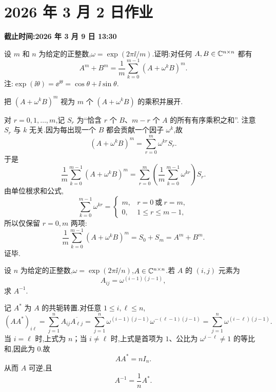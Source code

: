 \section*{2026 年 3 月 2 日作业}
{}
\noindent\textbf{截止时间:2026 年 3 月 9 日 13:30}
\setcounter{problem}{0}

\begin{problem}
设 $m$ 和 $n$ 为给定的正整数,$\omega = \exp(2\pi \ii / m)$.证明:对任何 $A, B \in \mathbb{C}^{n\times n}$ 都有
\[
A^m + B^m = \frac{1}{m}\sum_{k=0}^{m-1} \left(A + \omega^k B\right)^m.
\]
注:$\exp(\ii\theta) = \ee^{\ii\theta} = \cos\theta + \ii\sin\theta$.

\begin{solution}
把 $(A+\omega^kB)^m$ 视为 $m$ 个 $(A+\omega^kB)$ 的乘积并展开.

对 $r=0,1,\dots,m$,记 $S_r$ 为“恰含 $r$ 个 $B$、$m-r$ 个 $A$ 的所有有序乘积之和”.
注意 $S_r$ 与 $k$ 无关.因为每出现一个 $B$ 都会贡献一个因子 $\omega^k$,故
\[
(A+\omega^kB)^m=\sum_{r=0}^m \omega^{kr}S_r.
\]
于是
\[
\frac1m\sum_{k=0}^{m-1}(A+\omega^kB)^m
=\sum_{r=0}^m\left(\frac1m\sum_{k=0}^{m-1}\omega^{kr}\right)S_r.
\]
由单位根求和公式,
\[
\sum_{k=0}^{m-1}\omega^{kr}=
\begin{cases}
m,& r=0\ \text{或}\ r=m,\\
0,& 1\le r\le m-1,
\end{cases}
\]
所以仅保留 $r=0,m$ 两项:
\[
\frac1m\sum_{k=0}^{m-1}(A+\omega^kB)^m=S_0+S_m=A^m+B^m.
\]
证毕.
\end{solution}
\end{problem}

\begin{problem}
设 $n$ 为给定的正整数,$\omega = \exp(2\pi \ii / n)$,$A \in \mathbb{C}^{n\times n}$.若 $A$ 的 $(i,j)$ 元素为
\[
A_{ij} = \omega^{(i-1)(j-1)},
\]
求 $A^{-1}$.

\begin{solution}
记 $A^\ast$ 为 $A$ 的共轭转置.对任意 $1\le i,\ell\le n$,
\[
(AA^\ast)_{i\ell}
=\sum_{j=1}^n A_{ij}\overline{A_{\ell j}}
=\sum_{j=1}^n \omega^{(i-1)(j-1)}\omega^{-(\ell-1)(j-1)}
=\sum_{j=1}^n \omega^{(i-\ell)(j-1)}.
\]
当 $i=\ell$ 时,上式为 $n$；当 $i\ne \ell$ 时,上式是首项为 $1$、公比为
$\omega^{i-\ell}\ne1$ 的等比和,因此为 $0$.故
\[
AA^\ast=nI_n.
\]
从而 $A$ 可逆,且
\[
A^{-1}=\frac1nA^\ast.
\]
\end{solution}
\end{problem}

